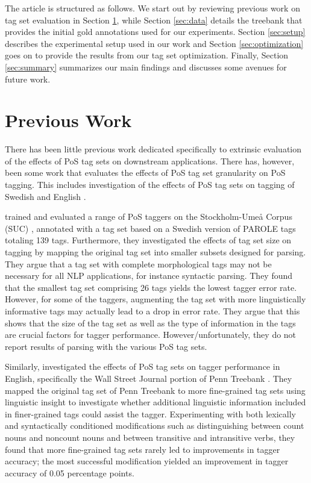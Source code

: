 \documentclass[11pt,a4paper]{article}
\begin{document}
The article is structured as follows. We start out by reviewing previous work
on tag set evaluation in Section \ref{sec:prev}, while Section \ref{sec:data}
details the treebank that provides the initial gold annotations used for our
experiments. Section \ref{sec:setup} describes the experimental setup used in
our work and Section \ref{sec:optimization} goes on to provide the results from
our tag set optimization. Finally, Section \ref{sec:summary} summarizes our
main findings and discusses some avenues for future work.

\section{Previous Work}
\label{sec:prev}
There has been little previous work dedicated specifically to
extrinsic evaluation of the effects of PoS tag sets on downstream
applications.  There has, however, been some work that evaluates the
effects of PoS tag set granularity on PoS tagging. This includes
investigation of the effects of PoS tag sets on tagging of Swedish
\cite{Meg:01,Meg:02} and English \cite{Mac:05}.


 trained and evaluated a range of PoS taggers on the
Stockholm-Umeå Corpus (SUC) \cite{Gus:Har:06}, annotated with a tag set based
on a Swedish version of PAROLE tags totaling 139 tags.  Furthermore, they
investigated the effects of tag set size on tagging by mapping the original tag
set into smaller subsets designed for parsing. They argue that a tag set with
complete morphological tags may not be necessary for all NLP applications, for
instance syntactic parsing. They found that the smallest tag set comprising 26
tags yields the lowest tagger error rate.  However, for some of the taggers,
augmenting the tag set with more linguistically informative tags may actually
lead to a drop in error rate. They argue that this shows that the size of the
tag set as well as the type of information in the tags are crucial factors for
tagger performance.  However/unfortunately, they do not report results of
parsing with the various PoS tag sets.

Similarly,  investigated the effects of PoS tag sets on tagger
performance in English, specifically the Wall Street Journal portion of Penn
Treebank \cite{Mar:San:Mar:93}. They mapped the original tag set of Penn
Treebank to more fine-grained tag sets using linguistic insight to investigate
whether additional linguistic information included in finer-grained tags could
assist the tagger. Experimenting with both lexically and syntactically
conditioned modifications such as distinguishing between count nouns and
noncount nouns and between transitive and intransitive verbs, they found that
more fine-grained tag sets rarely led to improvements in tagger accuracy; the
most successful modification yielded an improvement in tagger accuracy of 0.05
percentage points.
\end{document}
